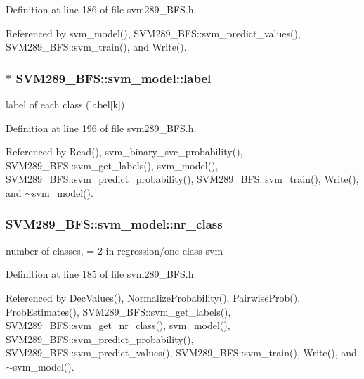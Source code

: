 Definition at line 186 of file svm289\+\_\+\+B\+F\+S.\+h.



Referenced by svm\+\_\+model(), S\+V\+M289\+\_\+\+B\+F\+S\+::svm\+\_\+predict\+\_\+values(), S\+V\+M289\+\_\+\+B\+F\+S\+::svm\+\_\+train(), and Write().

\subsubsection[{\texorpdfstring{label}{label}}]{$\ast$ S\+V\+M289\+\_\+\+B\+F\+S\+::svm\+\_\+model\+::label}\hypertarget{struct_s_v_m289___b_f_s_1_1svm__model_a33bf273b5ce4cfff0b4d68210bfa7b2e}{}\label{struct_s_v_m289___b_f_s_1_1svm__model_a33bf273b5ce4cfff0b4d68210bfa7b2e}
label of each class (label\mbox{[}k\mbox{]}) 

Definition at line 196 of file svm289\+\_\+\+B\+F\+S.\+h.



Referenced by Read(), svm\+\_\+binary\+\_\+svc\+\_\+probability(), S\+V\+M289\+\_\+\+B\+F\+S\+::svm\+\_\+get\+\_\+labels(), svm\+\_\+model(), S\+V\+M289\+\_\+\+B\+F\+S\+::svm\+\_\+predict\+\_\+probability(), S\+V\+M289\+\_\+\+B\+F\+S\+::svm\+\_\+train(), Write(), and $\sim$svm\+\_\+model().

\subsubsection[{\texorpdfstring{nr\+\_\+class}{nr_class}}]{ S\+V\+M289\+\_\+\+B\+F\+S\+::svm\+\_\+model\+::nr\+\_\+class}\hypertarget{struct_s_v_m289___b_f_s_1_1svm__model_af8462268ac97b24a8d96f07874522cfb}{}\label{struct_s_v_m289___b_f_s_1_1svm__model_af8462268ac97b24a8d96f07874522cfb}
number of classes, = 2 in regression/one class svm 

Definition at line 185 of file svm289\+\_\+\+B\+F\+S.\+h.



Referenced by Dec\+Values(), Normalize\+Probability(), Pairwise\+Prob(), Prob\+Estimates(), S\+V\+M289\+\_\+\+B\+F\+S\+::svm\+\_\+get\+\_\+labels(), S\+V\+M289\+\_\+\+B\+F\+S\+::svm\+\_\+get\+\_\+nr\+\_\+class(), svm\+\_\+model(), S\+V\+M289\+\_\+\+B\+F\+S\+::svm\+\_\+predict\+\_\+probability(), S\+V\+M289\+\_\+\+B\+F\+S\+::svm\+\_\+predict\+\_\+values(), S\+V\+M289\+\_\+\+B\+F\+S\+::svm\+\_\+train(), Write(), and $\sim$svm\+\_\+model().

